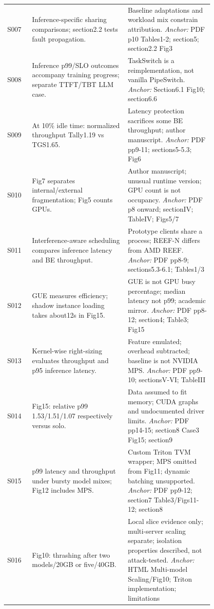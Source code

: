 \begin{longtable}{P{0.105\linewidth}P{0.39\linewidth}P{0.35\linewidth}}
S007 \cite{krypton} & Inference-specific sharing comparisons; section2.2 tests fault propagation. & Baseline adaptations and workload mix constrain attribution. \emph{Anchor:} PDF p10 Tables1-2; section5; section2.2 Fig3 \\
S008 \cite{sirius} & Inference p99/SLO outcomes accompany training progress; separate TTFT/TBT LLM case. & TaskSwitch is a reimplementation, not vanilla PipeSwitch. \emph{Anchor:} Section6.1 Fig10; section6.6 \\
S009 \cite{tally} & At 10\% idle time: normalized throughput Tally1.19 vs TGS1.65. & Latency protection sacrifices some BE throughput; author manuscript. \emph{Anchor:} PDF pp9-11; sections5-5.3; Fig6 \\
S010 \cite{parva} & Fig7 separates internal/external fragmentation; Fig5 counts GPUs. & Author manuscript; unusual runtime version; GPU count is not occupancy. \emph{Anchor:} PDF p8 onward; sectionIV; TableIV; Figs5/7 \\
S011 \cite{orion} & Interference-aware scheduling compares inference latency and BE throughput. & Prototype clients share a process; REEF-N differs from AMD REEF. \emph{Anchor:} PDF pp8-9; sections5.3-6.1; Tables1/3 \\
S012 \cite{gslice} & GUE measures efficiency; shadow instance loading takes about12s in Fig15. & GUE is not GPU busy percentage; median latency not p99; academic mirror. \emph{Anchor:} PDF pp8-12; section4; Table3; Fig15 \\
S013 \cite{krisp} & Kernel-wise right-sizing evaluates throughput and p95 inference latency. & Feature emulated; overhead subtracted; baseline is not NVIDIA MPS. \emph{Anchor:} PDF pp9-10; sectionsV-VI; TableIII \\
S014 \cite{xsched} & Fig15: relative p99 1.53/1.51/1.07 respectively versus solo. & Data assumed to fit memory; CUDA graphs and undocumented driver limits. \emph{Anchor:} PDF pp14-15; section8 Case3 Fig15; section9 \\
S015 \cite{paella} & p99 latency and throughput under bursty model mixes; Fig12 includes MPS. & Custom Triton TVM wrapper; MPS omitted from Fig11; dynamic batching unsupported. \emph{Anchor:} PDF pp9-12; section7 Table3/Figs11-12; section8 \\
S016 \cite{gnntriton} & Fig10: thrashing after two models/20GB or five/40GB. & Local slice evidence only; multi-server scaling separate; isolation properties described, not attack-tested. \emph{Anchor:} HTML Multi-model Scaling/Fig10; Triton implementation; limitations \\

\end{longtable}
